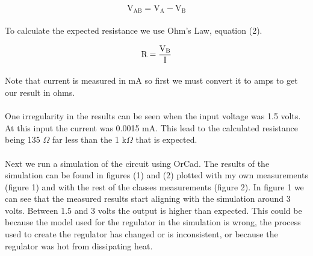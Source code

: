 \documentclass{article}
\begin{document}
\begin{equation}
	\text{V}_\text{AB} = \text{V}_\text{A} - \text{V}_\text{B}
\end{equation}

\paragraph{}
To calculate the expected resistance we use Ohm's Law, equation (2).

\begin{equation}
	\text{R} = {\text{V}_\text{B} \over \text{I}}
\end{equation}

\paragraph{}
Note that current is measured in mA so first we must convert it to amps to get our result in ohms.

\paragraph{}
One irregularity in the results can be seen when the input voltage was 1.5 volts. At this input the current was 0.0015 mA. This lead to the calculated resistance being 135 $\Omega$ far less than the 1 k$\Omega$ that is expected.

\paragraph{}
Next we run a simulation of the circuit using OrCad. The results of the simulation can be found in figures (1) and (2) plotted with my own measurements (figure 1) and with the rest of the classes measurements (figure 2). In figure 1 we can see that the measured results start aligning with the simulation around 3 volts. Between 1.5 and 3 volts the output is higher than expected. This could be because the model used for the regulator in the simulation is wrong, the process used to create the regulator has changed or is inconsistent, or because the regulator was hot from dissipating heat.
\end{document}
